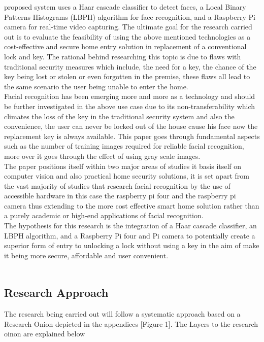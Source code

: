 \documentclass[journal]{IEEEtran}
\begin{document}
 proposed system uses a Haar cascade classifier to detect faces, a Local Binary Patterns Histograms (LBPH) algorithm for face recognition, and a Raspberry Pi camera for real-time video capturing. The ultimate goal for the research carried out is to evaluate the feasibility of using the above mentioned technologies as a cost-effective and secure home entry solution in replacement of a conventional lock and key. The rational behind researching this topic is due to flaws with traditional security measures which include, the need for a key, the chance of the key being lost or stolen or even forgotten  in the premise, these flaws all lead to the same scenario the user being unable to enter the home.\\ Facial recognition has been emerging more and more as a technology and should be further investigated in the above use case due to its non-transferability which climates the loss of the key in the traditional security system and also the convenience, the user can never be locked out of the house cause his face now the replacement key is always available. This paper goes through fundamental aspects such as the number of training images required for reliable facial recognition, more over it goes through the effect of using gray scale images.\\
The paper positions itself within two major areas of studies it basis itself on computer vision and also practical home security solutions, it is set apart from the vast majority of studies that research facial recognition by the use of accessible hardware in this case the raspberry pi four and the raspberry pi camera thus extending to the more cost effective smart home solution rather than a purely academic or high-end applications of facial recognition.\\
The hypothesis for this research is the integration of a Haar cascade classifier, an LBPH algorithm, and a Raspberry Pi four and Pi camera to potentially create a superior form of entry to unlocking a lock without using a key in the aim of make it being more secure, affordable and user convenient.\\
\\

\subsection{Research Approach}

The research being carried out will follow a systematic approach based on a Research Onion depicted in the appendices [Figure 1]. The Layers to the research oinon are explained below 
\end{document}
